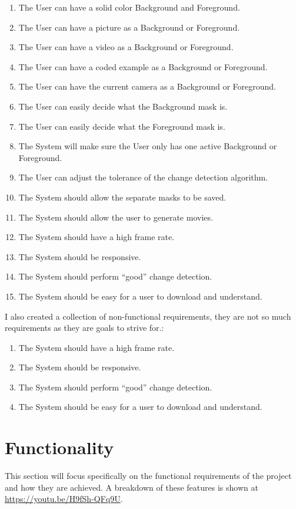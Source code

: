\documentclass[a4paper]{report}
\begin{document}
\begin{enumerate}
\item The User can have a solid color Background and Foreground.
\item The User can have a picture as a Background or Foreground.
\item The User can have a video as a Background or Foreground.
\item The User can have a coded example as a Background or Foreground.
\item The User can have the current camera as a Background or Foreground.
\item The User can easily decide what the Background mask is.
\item The User can easily decide what the Foreground mask is.
\item The System will make sure the User only has one active Background or Foreground.
\item The User can adjust the tolerance of the change detection algorithm.
\item The System should allow the separate masks to be saved.
\item The System should allow the user to generate movies.
\item The System should have a high frame rate.
\item The System should be responsive.
\item The System should perform “good” change detection.
\item The System should be easy for a user to download and understand.
\end{enumerate}

I also created a collection of non-functional requirements, they are not so much requirements as they are goals to strive for.:

\begin{enumerate}
\item The System should have a high frame rate.
\item The System should be responsive.
\item The System should perform “good” change detection.
\item The System should be easy for a user to download and understand.
\end{enumerate}

\section{Functionality}
This section will focus specifically on the functional requirements of the project and how they are achieved. A breakdown of these features is shown at \url{https://youtu.be/H9fSh-QFq9U}.
\end{document}
